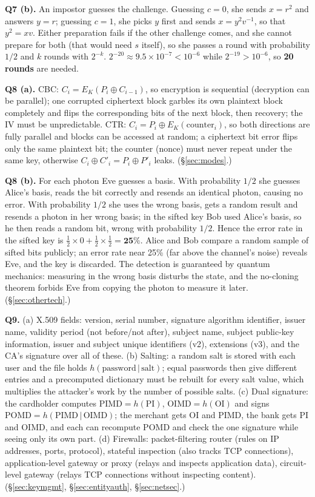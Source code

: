 \textbf{Q7 (b).} An impostor guesses the challenge. Guessing $c = 0$, she sends $x = r^2$ and answers $y = r$; guessing $c = 1$, she picks $y$ first and sends $x = y^2 v^{-1}$, so that $y^2 = x v$. Either preparation fails if the other challenge comes, and she cannot prepare for both (that would need $s$ itself), so she passes a round with probability $1/2$ and $k$ rounds with $2^{-k}$. $2^{-20} \approx 9.5 \times 10^{-7} < 10^{-6}$ while $2^{-19} > 10^{-6}$, so \textbf{20 rounds} are needed.

\textbf{Q8 (a).} CBC: $C_i = E_K(P_i \oplus C_{i-1})$, so encryption is sequential (decryption can be parallel); one corrupted ciphertext block garbles its own plaintext block completely and flips the corresponding bits of the next block, then recovery; the IV must be unpredictable. CTR: $C_i = P_i \oplus E_K(\text{counter}_i)$, so both directions are fully parallel and blocks can be accessed at random; a ciphertext bit error flips only the same plaintext bit; the counter (nonce) must never repeat under the same key, otherwise $C_i \oplus C'_i = P_i \oplus P'_i$ leaks. (\S\ref{sec:modes}.)

\textbf{Q8 (b).} For each photon Eve guesses a basis. With probability $1/2$ she guesses Alice's basis, reads the bit correctly and resends an identical photon, causing no error. With probability $1/2$ she uses the wrong basis, gets a random result and resends a photon in her wrong basis; in the sifted key Bob used Alice's basis, so he then reads a random bit, wrong with probability $1/2$. Hence the error rate in the sifted key is $\tfrac12 \times 0 + \tfrac12 \times \tfrac12 = \mathbf{25\%}$. Alice and Bob compare a random sample of sifted bits publicly; an error rate near 25\% (far above the channel's noise) reveals Eve, and the key is discarded. The detection is guaranteed by quantum mechanics: measuring in the wrong basis disturbs the state, and the no-cloning theorem forbids Eve from copying the photon to measure it later. (\S\ref{sec:othertech}.)

\textbf{Q9.} (a) X.509 fields: version, serial number, signature algorithm identifier, issuer name, validity period (not before/not after), subject name, subject public-key information, issuer and subject unique identifiers (v2), extensions (v3), and the CA's signature over all of these. (b) Salting: a random salt is stored with each user and the file holds $h(\text{password} \,|\, \text{salt})$; equal passwords then give different entries and a precomputed dictionary must be rebuilt for every salt value, which multiplies the attacker's work by the number of possible salts. (c) Dual signature: the cardholder computes $\text{PIMD} = h(\text{PI})$, $\text{OIMD} = h(\text{OI})$ and signs $\text{POMD} = h(\text{PIMD} \,|\, \text{OIMD})$; the merchant gets OI and PIMD, the bank gets PI and OIMD, and each can recompute POMD and check the one signature while seeing only its own part. (d) Firewalls: packet-filtering router (rules on IP addresses, ports, protocol), stateful inspection (also tracks TCP connections), application-level gateway or proxy (relays and inspects application data), circuit-level gateway (relays TCP connections without inspecting content). (\S\ref{sec:keymgmt}, \S\ref{sec:entityauth}, \S\ref{sec:netsec}.)

